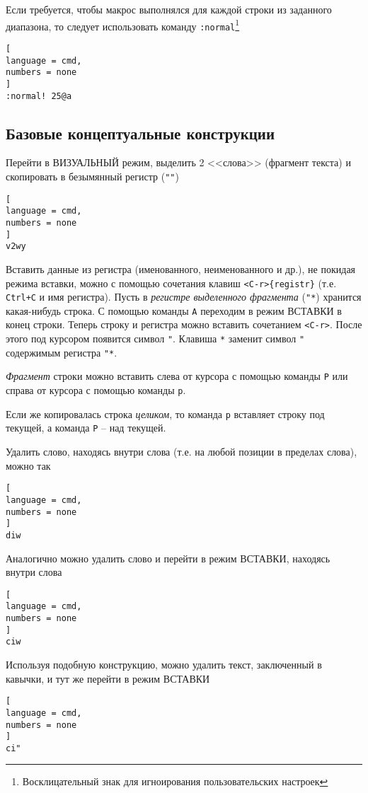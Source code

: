 \documentclass[%
	11pt,
	a4paper,
	utf8,
		]{article}
\begin{document}
Если требуется, чтобы макрос выполнялся для каждой строки из заданного диапазона, то следует использовать команду \texttt{:normal}\footnote{Восклицательный знак для игноирования пользовательских настроек}
\begin{lstlisting}[
language = cmd,
numbers = none
]
:normal! 25@a
\end{lstlisting}



\subsection{Базовые концептуальные конструкции}

Перейти в ВИЗУАЛЬНЫЙ режим, выделить 2 <<слова>> (фрагмент текста) и скопировать в безымянный регистр (\verb|""|)
\begin{lstlisting}[
language = cmd,
numbers = none
]
v2wy
\end{lstlisting}

Вставить данные из регистра (именованного, неименованного и др.), не покидая режима вставки, можно с помощью сочетания клавиш \verb|<C-r>{registr}| (т.е. \texttt{Ctrl+C} и имя регистра). Пусть в \emph{регистре выделенного фрагмента} (\texttt{"*}) хранится какая-нибудь строка. С помощью команды \texttt{A} переходим в режим ВСТАВКИ в конец строки. Теперь строку и регистра можно вставить сочетанием \verb|<C-r>|. После этого под курсором появится символ \verb|"|. Клавиша \texttt{*} заменит символ \verb|"| содержимым регистра \verb|"*|.

\emph{Фрагмент} строки можно вставить слева от курсора с помощью команды \texttt{P} или справа от курсора с помощью команды \texttt{p}.

Если же копировалась строка \emph{целиком}, то команда \texttt{p} вставляет строку под текущей, а команда \texttt{P} -- над текущей.

Удалить слово, находясь внутри слова (т.е. на любой позиции в пределах слова), можно так
\begin{lstlisting}[
language = cmd,
numbers = none
]
diw
\end{lstlisting}

Аналогично можно удалить слово и перейти в режим ВСТАВКИ, находясь внутри слова
\begin{lstlisting}[
language = cmd,
numbers = none
]
ciw
\end{lstlisting}

Используя подобную конструкцию, можно удалить текст, заключенный в кавычки, и тут же перейти в режим ВСТАВКИ
\begin{lstlisting}[
language = cmd,
numbers = none
]
ci"
\end{lstlisting}
\end{document}
